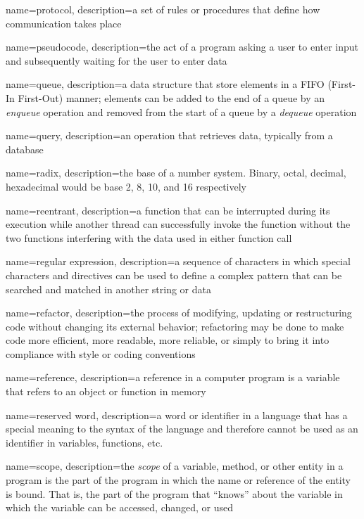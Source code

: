 {
  name=protocol,
  description={a set of rules or procedures that define how communication takes place}
}

{
  name=pseudocode,
  description={the act of a program asking a user to enter input and subsequently waiting for the user to enter data}
}

{
  name=queue,
  description={a data structure that store elements in a FIFO (First-In First-Out) manner; elements can be added to the end of a queue by an \emph{enqueue} operation and removed from the start of a queue by a \emph{dequeue} operation}
}

{
  name=query,
  description={an operation that retrieves data, typically from a database}
}


{
  name=radix,
  description={the base of a number system.  Binary, octal, decimal, hexadecimal would be base 2, 8, 10, and 16 respectively}
}

{
  name=reentrant,
  description={a function that can be interrupted during its execution while another thread can successfully invoke the function without the two functions interfering with the data used in either function call}
}

{
  name=regular expression,
  description={a sequence of characters in which special characters and directives can be used to define a complex pattern that can be searched and matched in another string or data}
}

{
  name=refactor,
  description={the process of modifying, updating or restructuring code without changing its external behavior; refactoring may be done to make code more efficient, more readable, more reliable, or simply to bring it into compliance with style or coding conventions}
}

{
  name=reference,
  description={a reference in a computer program is a variable that refers to an object or function in memory}
}

{
  name=reserved word,
  description={a word or identifier in a language that has a special meaning to the syntax of the language and 
  	therefore cannot be used as an identifier in variables, functions, etc.}
}

{
  name=scope,
  description={the \emph{scope} of a variable, method, or other entity in a program
  	is the part of the program in which the name or reference of the entity is bound.
	That is, the part of the program that ``knows'' about the variable in which the variable
	can be accessed, changed, or used}
}


